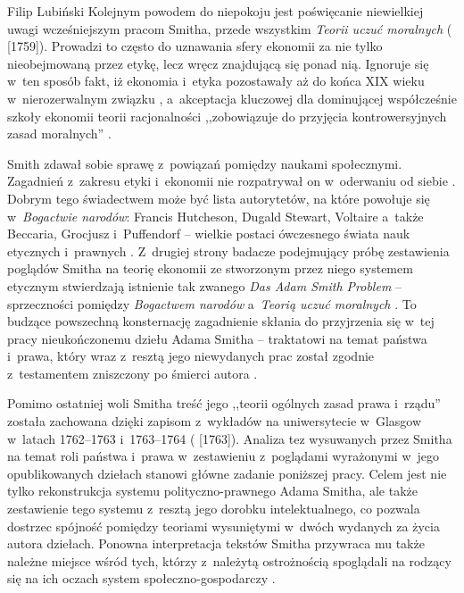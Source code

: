 \begin{artplenv}{Filip Lubiński}
Kolejnym powodem do niepokoju jest poświęcanie niewielkiej uwagi wcześniejszym pracom Smitha, przede wszystkim
\textit{Teorii uczuć moralnych}
(\cite{smith_teoria_1989} [1759]).
Prowadzi to często do uznawania sfery
ekonomii za nie tylko nieobejmowaną przez etykę, lecz wręcz znajdującą się ponad nią. Ignoruje się w~ten sposób fakt,
iż ekonomia i~etyka pozostawały aż do końca XIX wieku w~nierozerwalnym związku
\parencite[s.~235]{rawls_wyklady_2010},
a~akceptacja kluczowej dla dominującej współcześnie szkoły ekonomii teorii racjonalności ,,zobowiązuje do
przyjęcia kontrowersyjnych zasad moralnych''
\parencites[s.~50]{hausman_etyka_2017}{turek_2019}.

Smith zdawał sobie sprawę z~powiązań pomiędzy naukami społecznymi. Zagadnień z~zakresu etyki i~ekonomii nie
rozpatrywał on w~oderwaniu od siebie
\parencite[s.~130]{soll_reckoning:_2014}.
Dobrym tego świadectwem może być
lista autorytetów, na które powołuje się w~\textit{Bogactwie narodów}: Francis Hutcheson, Dugald Stewart,
Voltaire a~także Beccaria, Grocjusz i~Puffendorf -- wielkie postaci ówczesnego świata nauk etycznych i~prawnych
\parencite[s.~654]{boorstin_discoverers:_1983}.
Z~drugiej strony badacze podejmujący próbę zestawienia poglądów
Smitha na teorię ekonomii ze stworzonym przez niego systemem etycznym stwierdzają istnienie tak zwanego \textit{Das
Adam Smith Problem} -- sprzeczności pomiędzy \textit{Bogactwem narodów} a~\textit{Teorią uczuć moralnych}
\parencites[s.~215–216]{sedlacek_ekonomia_2012}{turek_2019}.
To budzące powszechną konsternację zagadnienie skłania do
przyjrzenia się w~tej pracy nieukończonemu dziełu Adama Smitha -- traktatowi na temat państwa i~prawa, który
wraz z~resztą jego niewydanych prac został zgodnie z~testamentem zniszczony po śmierci autora
\parencite[s.~140]{buchan_adam_2008}.

Pomimo ostatniej woli Smitha treść jego ,,teorii ogólnych zasad prawa i~rządu'' została zachowana dzięki
zapisom z~wykładów na uniwersytecie w~Glasgow w~latach 1762--1763 i~1763--1764
(\cite{smith_lectures_1982} [1763]).
Analiza tez wysuwanych przez Smitha na temat roli państwa i~prawa w~zestawieniu z~poglądami wyrażonymi w~jego
opublikowanych dziełach stanowi główne zadanie poniższej pracy. Celem jest nie tylko rekonstrukcja systemu
polityczno-prawnego Adama Smitha, ale także zestawienie tego systemu z~resztą jego dorobku intelektualnego, co pozwala
dostrzec spójność pomiędzy teoriami wysuniętymi w~dwóch wydanych za życia autora dziełach. Ponowna interpretacja
tekstów Smitha przywraca mu także należne miejsce wśród tych, którzy z~należytą ostrożnością spoglądali na rodzący się
na ich oczach system społeczno-gospodarczy
\parencite[s.~83]{ferguson_wielka_2017}.



\end{artplenv}
